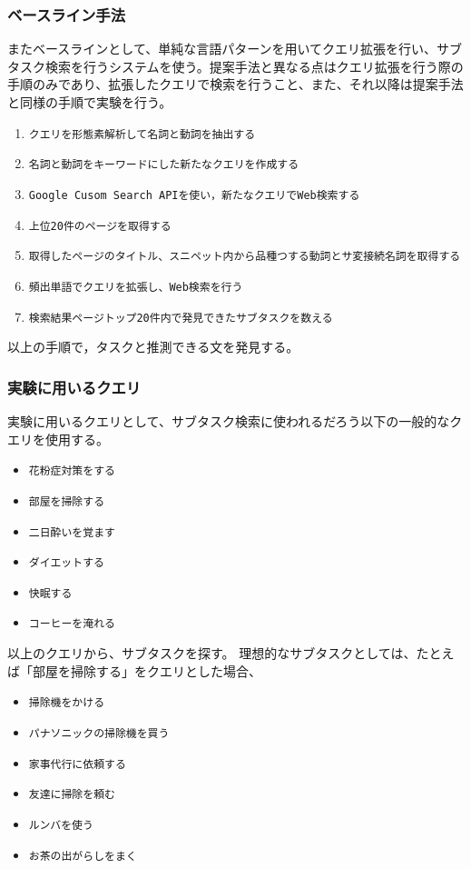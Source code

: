 \documentclass[submit,techreq]{ipsj}
\def\|{\verb|}
\begin{document}
%5.1.2
\subsubsection{ベースライン手法}

またベースラインとして、単純な言語パターンを用いてクエリ拡張を行い、サブタスク検索を行うシステムを使う。提案手法と異なる点はクエリ拡張を行う際の手順のみであり、拡張したクエリで検索を行うこと、また、それ以降は提案手法と同様の手順で実験を行う。


\begin{enumerate}
\item \|クエリを形態素解析して名詞と動詞を抽出する|
\item \|名詞と動詞をキーワードにした新たなクエリを作成する|
\item \|Google Cusom Search APIを使い，新たなクエリでWeb検索する|
\item \|上位20件のページを取得する|
\item \|取得したページのタイトル、スニペット内から品種つする動詞とサ変接続名詞を取得する|
\item \|頻出単語でクエリを拡張し、Web検索を行う|
\item \|検索結果ページトップ20件内で発見できたサブタスクを数える|
\end{enumerate}

以上の手順で，タスクと推測できる文を発見する。

\subsubsection{実験に用いるクエリ}

実験に用いるクエリとして、サブタスク検索に使われるだろう以下の一般的なクエリを使用する。

\begin{itemize}
\item \|花粉症対策をする|
\item \|部屋を掃除する|
\item \|二日酔いを覚ます|
\item \|ダイエットする|
\item \|快眠する|
\item \|コーヒーを淹れる|
\end{itemize}


以上のクエリから、サブタスクを探す。
理想的なサブタスクとしては、たとえば「部屋を掃除する」をクエリとした場合、

\begin{itemize}
\item \|掃除機をかける|
\item \|パナソニックの掃除機を買う|
\item \|家事代行に依頼する|
\item \|友達に掃除を頼む|
\item \|ルンバを使う|
\item \|お茶の出がらしをまく|
\end{itemize}
\end{document}
